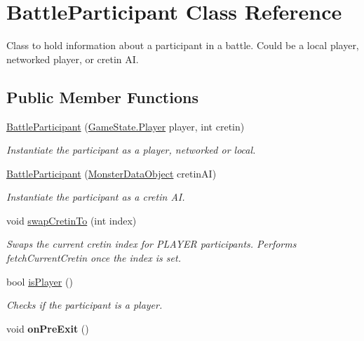 \hypertarget{class_battle_participant}{\section{Battle\-Participant Class Reference}
\label{class_battle_participant}
}


Class to hold information about a participant in a battle. Could be a local player, networked player, or cretin A\-I.  


\subsection*{Public Member Functions}
\begin{DoxyCompactItemize}
\item 
\hyperlink{class_battle_participant_aa08199f7a1456a22690a8a4b61da5089}{Battle\-Participant} (\hyperlink{class_game_state_1_1_player}{Game\-State.\-Player} player, int cretin)
\begin{DoxyCompactList}\small\item\em Instantiate the participant as a player, networked or local. \end{DoxyCompactList}\item 
\hyperlink{class_battle_participant_a636ea63e4b3f972767322e56aa5f3088}{Battle\-Participant} (\hyperlink{class_monster_data_object}{Monster\-Data\-Object} cretin\-A\-I)
\begin{DoxyCompactList}\small\item\em Instantiate the participant as a cretin A\-I. \end{DoxyCompactList}\item 
void \hyperlink{class_battle_participant_a32c2449a4bf42f88a7abd2ac5639add2}{swap\-Cretin\-To} (int index)
\begin{DoxyCompactList}\small\item\em Swaps the current cretin index for P\-L\-A\-Y\-E\-R participants. Performs fetch\-Current\-Cretin once the index is set. \end{DoxyCompactList}\item 
bool \hyperlink{class_battle_participant_a772329be78feaa3c85a692c39dc54a47}{is\-Player} ()
\begin{DoxyCompactList}\small\item\em Checks if the participant is a player. \end{DoxyCompactList}\item 
\hypertarget{class_battle_participant_a4c33e6fb2e2fe3d174a4315e9b73df4a}{void {\bfseries on\-Pre\-Exit} ()}\label{class_battle_participant_a4c33e6fb2e2fe3d174a4315e9b73df4a}

\end{DoxyCompactItemize}
